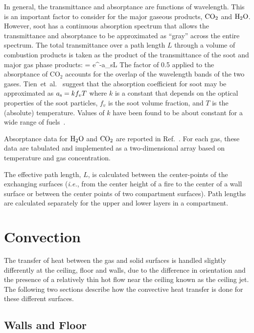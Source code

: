 \documentclass[12pt]{book}
\begin{document}
In general, the transmittance and absorptance are functions of wavelength. This is an important factor to consider for the major gaseous products, $\textnormal{CO}_2$  and $\textnormal{H}_2 \textnormal{O}$. However, soot has a continuous absorption spectrum that allows the transmittance and absorptance to be approximated as ``gray'' \cite{SiegelandHowell:1981} across the entire spectrum. The total transmittance over a path length $L$ through a volume of combustion products is taken as the product of the transmittance of the soot and major gas phase products:
\be
   \tau = e^{-a_{\rm s}L} 
\ee
The factor of 0.5 applied to the absorptance of CO$_2$ accounts for the overlap of the wavelength bands of the two gases. Tien~et~al.~\cite{Tien:2002} suggest that the absorption coefficient for soot may be approximated as $a_{\rm s} = k f_v T$ where $k$ is a constant that depends on the optical properties of the soot particles, $f_v$ is the soot volume fraction, and $T$ is the (absolute) temperature. Values of $k$ have been found to be about constant for a wide range of fuels~\cite{Tien:1978}.

Absorptance data for $\textnormal{H}_2 \textnormal{O}$ and $\textnormal{CO}_2$ are reported in Ref.~\cite{Edwards:1985}. For each gas, these data are tabulated and implemented as a two-dimensional array based on temperature and gas concentration.

The effective path length, $L$, is calculated between the center-points of the exchanging surfaces ({\em i.e.}, from the center height of a fire to the center of a wall surface or between the center points of two compartment surfaces). Path lengths are calculated separately for the upper and lower layers in a compartment.




\section{Convection}

The transfer of heat between the gas and solid surfaces is handled slightly differently at the ceiling, floor and walls, due to the difference in orientation and the presence of a relatively thin hot flow near the ceiling known as the ceiling jet. The following two sections describe how the convective heat transfer is done for these different surfaces.

\subsection{Walls and Floor}
\end{document}
